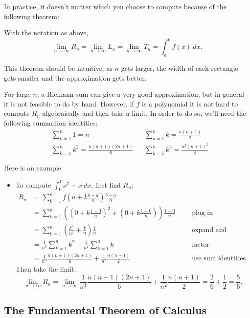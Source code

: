 In practice, it doesn't matter which you choose to compute because of the following theorem:
\begin{thm} With the notation as above,
$$\lim_{n\to\infty}R_n=\lim_{n\to\infty}L_n=\lim_{n\to\infty}T_n=\int_a^bf(x)\ dx.$$
\end{thm}

This theorem should be intuitive: as $n$ gets larger, the width of each rectangle gets smaller and the approximation gets better.

For large $n$, a Riemann sum can give a very good approximation, but in general it is not feasible to do by hand. However, if $f$ is a polynomial it is not hard to compute $R_n$ algebraically and then take a limit. In order to do so, we'll need the following summation identities:
\begin{align*}
&\sum_{k=1}^n 1 = n 
& &
\sum_{k=1}^n k = \frac{n(n+1)}{2}\\
&\sum_{k=1}^n k^2 = \frac{n(n+1)(2n+1)}{6}
& &
\sum_{k=1}^n k^3 = \frac{n^2(n+1)^2}{4}
\end{align*}

Here is an example:
\begin{itemize}
    \item To compute $\int_{0}^{1}x^2+x\ dx$, first find $R_n$:
    \begin{align*}
        R_n
        & = \sum_{k=1}^{n}f\left(a+k\frac{b-a}{n}\right)\frac{b-a}{n}\\ 
        & = \sum_{k=1}^n\left(\left(0+k\frac{1-0}{n}\right)^2 + \left(0+k\frac{1-0}{n}\right)\right)\frac{1-0}{n}&&&\text{plug in}\\
        & = \sum_{k=1}^n\left(\frac{k^2}{n^2} + \frac{k}{n}\right)\frac{1}{n} &&&\text{expand and simplify}\\
        & = \frac{1}{n^3}\sum_{k=1}^nk^2+\frac{1}{n^2}\sum_{k=1}^nk &&& \text{factor}\\
        & = \frac{1}{n^3}\frac{n(n+1)(2n+1)}{6}+\frac{1}{n^2}\frac{n(n+1)}{2} &&&\text{use sum identities}
    \end{align*}
    Then take the limit:
    $$\lim_{n\to\infty}R_n=\lim_{n\to\infty} \frac{1}{n^3}\frac{n(n+1)(2n+1)}{6}+\frac{1}{n^2}\frac{n(n+1)}{2} = \frac{2}{6} + \frac{1}{2} = \frac{5}{6}.$$
    
\end{itemize}



\subsection{The Fundamental Theorem of Calculus}


